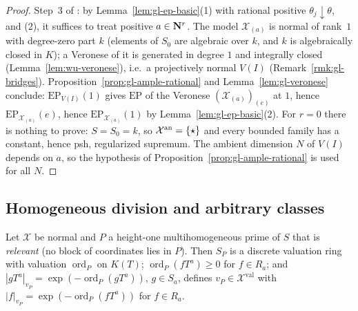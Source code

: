 \begin{proof}
Step~3 of \cite{FHX}: by Lemma~\ref{lem:gl-ep-basic}(1) with rational positive $\theta_j\downarrow\theta$, and (2), it suffices to treat positive $a\in\mathbf{N}^r$. The model
$\mathcal X_{(a)}$ is normal of rank~$1$ with degree-zero part $k$ (elements of $S_0$ are algebraic over $k$, and $k$ is algebraically closed in $K$); a
Veronese of it is generated in degree $1$ and integrally closed (Lemma~\ref{lem:wu-veronese}), i.e.\ a projectively normal $V(I)$
(Remark~\ref{rmk:gl-bridges}). Proposition~\ref{prop:gl-ample-rational} and Lemma~\ref{lem:gl-veronese} conclude: $\mathrm{EP}_{V(I)}(1)$ gives
$\mathrm{EP}$ of the Veronese $(\mathcal X_{(a)})_{(e)}$ at $1$, hence $\mathrm{EP}_{\mathcal X_{(a)}}(e)$, hence $\mathrm{EP}_{\mathcal X_{(a)}}(1)$ by
Lemma~\ref{lem:gl-ep-basic}(2). For $r=0$ there is nothing to prove: $S=S_0=k$, so $\mathcal X^{\mathrm{an}}=\{\star\}$ and every bounded family has a constant, hence psh,
regularized supremum. The ambient dimension $N$ of $V(I)$ depends on $a$, so the hypothesis of Proposition~\ref{prop:gl-ample-rational} is used for all $N$.
\end{proof}

\subsection{Homogeneous division and arbitrary classes}\label{subsec:gl-siu}

\begin{lemma}\label{lem:gl-divisor-points}
\leanok
{}
Let $\mathcal X$ be normal and $P$ a height-one multihomogeneous prime of $S$ that is \emph{relevant} (no block of coordinates lies in $P$). Then $S_P$ is a
discrete valuation ring with valuation $\operatorname{ord}_P$ on $K(T)$; $\operatorname{ord}_P(fT^a)\ge0$ for $f\in R_a$; and $|gT^a|_{v_P}=\exp(-\operatorname{ord}_P(gT^a))$,
$g\in S_a$, defines $v_P\in\mathcal X^{\mathrm{val}}$ with $|f|_{v_P}=\exp(-\operatorname{ord}_P(fT^a))$ for $f\in R_a$.
\end{lemma}

